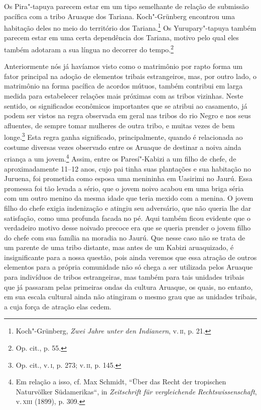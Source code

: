 Os Pira"-tapuya parecem estar em um tipo semelhante de relação de
submissão pacífica com a tribo Aruaque dos Tariana. Koch"-Grünberg
encontrou uma habitação deles no meio do território dos
Tariana.\footnote{Koch"-Grünberg, \emph{Zwei Jahre unter den Indianern},
  v.\,\textsc{ii}, p. 21.} Os Yurupary"-tapuya também parecem estar em uma certa
dependência dos Tariana, motivo pelo qual eles também adotaram a sua
língua no decorrer do tempo.\footnote{Op. cit., p. 55.}

Anteriormente nós já havíamos visto como o matrimônio por rapto forma um
fator principal na adoção de elementos tribais estrangeiros, mas, por
outro lado, o matrimônio na forma pacífica de acordos mútuos, também
contribui em larga medida para estabelecer relações mais próximas com as
tribos vizinhas. Neste sentido, os significados econômicos importantes
que se atribui ao casamento, já podem ser vistos na regra observada em
geral nas tribos do rio Negro e nos seus afluentes, de sempre tomar
mulheres de outra tribo, e muitas vezes de bem longe.\footnote{Op. cit.,
  v.\,\textsc{i}, p. 273; v.\,\textsc{ii}, p. 145.} Esta regra ganha significado,
principalmente, quando é relacionada ao costume diversas vezes observado
entre os Aruaque de destinar a noiva ainda criança a um jovem.\footnote{Em
  relação a isso, cf. Max Schmidt, ``Über das Recht der tropischen
  Naturvölker Südamerikas``, in \emph{Zeitschrift für vergleichende
  Rechtswissenschaft}, v.\,\textsc{xiii} (1899), p. 309.} Assim, entre os
Paresí"-Kabizi a um filho de chefe, de aproximadamente 11--12 anos, cujo
pai tinha suas plantações e sua habitação no Juruena, foi prometida
como esposa uma menininha em Uasirimi no Jaurú. Essa promessa foi tão
levada a sério, que o jovem noivo acabou em uma briga séria com um outro
menino da mesma idade que teria mexido com a menina. O jovem filho do
chefe exigia indenização e atingiu seu adversário, que não queria lhe
dar satisfação, como uma profunda facada no pé. Aqui também ficou
evidente que o verdadeiro motivo desse noivado precoce era que se queria
prender o jovem filho do chefe com sua família na moradia no Jaurú. Que
nesse caso não se trata de um parente de uma tribo distante, mas antes
de um Kabizi aruaquizado, é insignificante para a nossa questão, pois
ainda veremos que essa atração de outros elementos para a própria
comunidade não só chega a ser utilizada pelos Aruaque para indivíduos de
tribos estrangeiras, mas também para tais unidades tribais que já
passaram pelas primeiras ondas da cultura Aruaque, os quais, no
entanto, em sua escala cultural ainda não atingiram o mesmo grau que as
unidades tribais, a cuja força de atração elas cedem.

